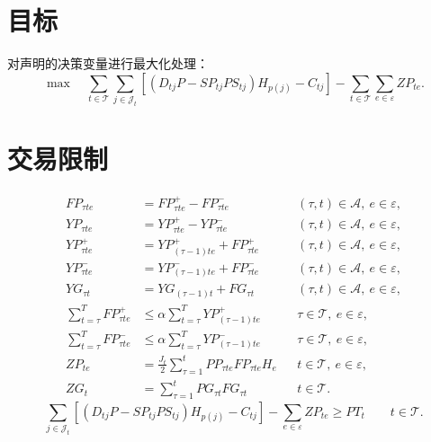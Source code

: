 \documentclass[11pt,a4paper]{article}
\begin{document}
\section*{目标}
对声明的决策变量进行最大化处理：
\begin{equation}
\max\quad
\sum_{t\in\mathcal T}\sum_{j\in\mathcal J_t}
\left[(D_{tj}P-SP_{tj}PS_{tj})H_{p(j)}-C_{tj}\right]
-\sum_{t\in\mathcal T}\sum_{e\in\varepsilon}ZP_{te}.
\tag{24}
\end{equation}

\section*{交易限制}
\begin{align}
FP_{\tau te}&=FP_{\tau te}^{+}-FP_{\tau te}^{-}
&& (\tau,t)\in\mathcal A,\ e\in\varepsilon,\tag{1}\\
YP_{\tau te}&=YP_{\tau te}^{+}-YP_{\tau te}^{-}
&& (\tau,t)\in\mathcal A,\ e\in\varepsilon,\tag{2}\\
YP_{\tau te}^{+}&=YP_{(\tau-1)te}^{+}+FP_{\tau te}^{+}
&& (\tau,t)\in\mathcal A,\ e\in\varepsilon,\tag{3}\\
YP_{\tau te}^{-}&=YP_{(\tau-1)te}^{-}+FP_{\tau te}^{-}
&& (\tau,t)\in\mathcal A,\ e\in\varepsilon,\tag{4}\\
YG_{\tau t}&=YG_{(\tau-1)t}+FG_{\tau t}
&& (\tau,t)\in\mathcal A,\ e\in\varepsilon,\tag{5}\\
\sum_{t=\tau}^{T}FP_{\tau te}^{+}
&\le\alpha\sum_{t=\tau}^{T}YP_{(\tau-1)te}^{+}
&& \tau\in\mathcal T,\ e\in\varepsilon,\tag{6}\\
\sum_{t=\tau}^{T}FP_{\tau te}^{-}
&\le\alpha\sum_{t=\tau}^{T}YP_{(\tau-1)te}^{-}
&& \tau\in\mathcal T,\ e\in\varepsilon,\tag{7}\\
ZP_{te}&=\frac{J_t}{2}\sum_{\tau=1}^{t}PP_{\tau te}FP_{\tau te}H_e
&&t\in\mathcal T,\ e\in\varepsilon,\tag{8}\\
ZG_t&=\sum_{\tau=1}^{t}PG_{\tau t}FG_{\tau t}
&&t\in\mathcal T.\tag{9}
\end{align}
\begin{equation}
\sum_{j\in\mathcal J_t}
\left[(D_{tj}P-SP_{tj}PS_{tj})H_{p(j)}-C_{tj}\right]
-\sum_{e\in\varepsilon}ZP_{te}\ge PT_t
\qquad t\in\mathcal T.
\tag{10}
\end{equation}
\end{document}
